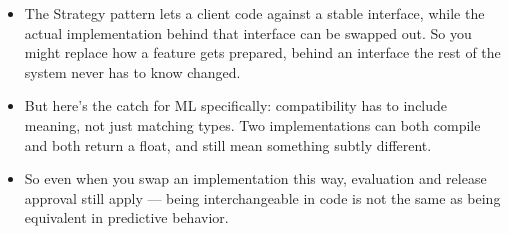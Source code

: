 \documentclass[11pt,a4paper]{article}
\begin{document}
\begin{examplebox}[title after break={SPOKEN SCRIPT --- slide 30 continued}]
\begin{itemize}
\item The Strategy pattern lets a client code against a stable interface, while the actual implementation behind that interface can be swapped out. So you might replace how a feature gets prepared, behind an interface the rest of the system never has to know changed.
\item But here's the catch for ML specifically: compatibility has to include meaning, not just matching types. Two implementations can both compile and both return a float, and still mean something subtly different.
\item So even when you swap an implementation this way, evaluation and release approval still apply — being interchangeable in code is not the same as being equivalent in predictive behavior.
\end{itemize}
\end{examplebox}
\par\noindent{\scriptsize\textcolor{teal!60!black}{Reading anchor: Kalinowski, Ch. 14 · Nazir et al. (2024)}}
\clearpage
\end{document}
